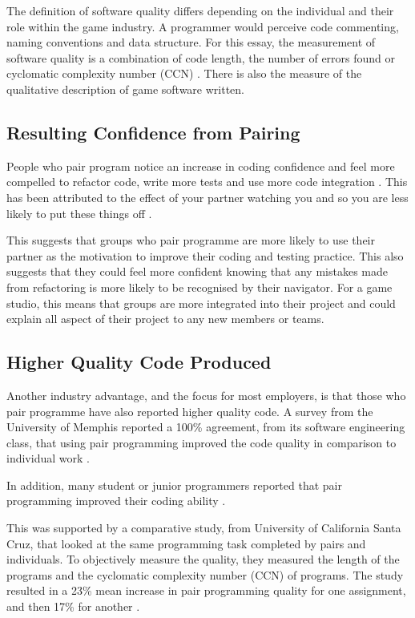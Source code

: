 \documentclass{scrartcl}
\begin{document}
The definition of software quality differs depending on the individual and their role within the game industry. A programmer would perceive code commenting, naming conventions and data structure. For this essay, the measurement of software quality is a combination of code length, the number of errors found or cyclomatic complexity number (CCN) \cite{Xenos:2000}. There is also the measure of the qualitative description of game software written.

\subsection{Resulting Confidence from Pairing}
People who pair program notice an increase in coding confidence and feel more compelled to refactor code, write more tests and use more code integration \cite{Sherrell:2006}. This has been attributed to the effect of your partner watching you and so you are less likely to put these things off \cite{Beck:2000}. 

This suggests that groups who pair programme are more likely to use their partner as the motivation to improve their coding and testing practice. This also suggests that they could feel more confident knowing that any mistakes made from refactoring is more likely to be recognised by their navigator. For a game studio, this means that groups are more integrated into their project and could explain all aspect of their project to any new members or teams.

\subsection{Higher Quality Code Produced}
Another industry advantage, and the focus for most employers, is that those who pair programme have also reported higher quality code. A survey from the University of Memphis reported a 100\% agreement, from its software engineering class, that using pair programming improved the code quality in comparison to individual work \cite{Sherrell:2006}.

In addition, many student or junior programmers reported that pair programming improved their coding ability \cite{Radermacher:2011}.

This was supported by a comparative study, from University of California Santa Cruz, that looked at the same programming task completed by pairs and individuals. To objectively measure the quality, they measured the length of the programs and the cyclomatic complexity number (CCN) \cite{Xenos:2000} of programs. The study resulted in a 23\% mean increase in pair programming quality for one assignment, and then 17\% for another \cite{Hanks:2004}.
\end{document}
